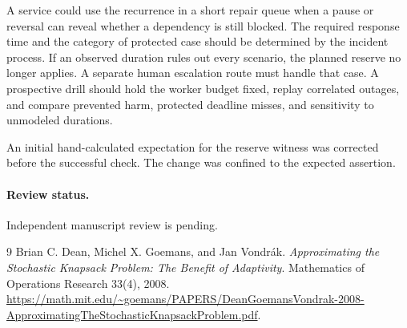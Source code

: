 \documentclass[11pt]{article}
\begin{document}
A service could use the recurrence in a short repair queue when
a pause or reversal can reveal whether a dependency is still
blocked. The required response time and the category of protected
case should be determined by the incident process. If an observed
duration rules out every scenario, the planned reserve no longer
applies. A separate human escalation route must handle that case.
A prospective drill should hold the worker budget fixed, replay
correlated outages, and compare prevented harm, protected deadline
misses, and sensitivity to unmodeled durations.

An initial hand-calculated expectation for the reserve witness was corrected before the successful check. The change was confined to the expected assertion.

\paragraph{Review status.} Independent manuscript review is pending.

\begin{thebibliography}{9}
 Brian C. Dean, Michel X. Goemans, and Jan Vondr\'ak.
\emph{Approximating the Stochastic Knapsack Problem:
The Benefit of Adaptivity}. Mathematics of Operations Research
33(4), 2008.
\url{https://math.mit.edu/~goemans/PAPERS/DeanGoemansVondrak-2008-ApproximatingTheStochasticKnapsackProblem.pdf}.
\end{thebibliography}
\end{document}
